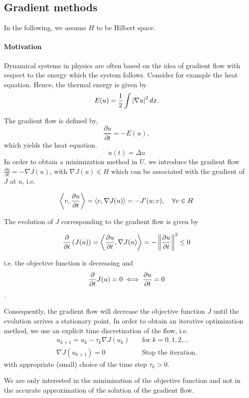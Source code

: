 \subsection{Gradient methods}
In the following, we assume $H$ to be Hilbert space.
\paragraph{Motivation}
	Dynamical systems in physics are often based on the idea of gradient flow with respect to the energy which the system follows. Consider for example the heat equation. Hence, the thermal energy is given by
	\[
		E(u)=\frac{1}{2}\int \left|\nabla u\right|^2 dx.
	\]
	
	The gradient flow is defined by,
	\[
		\frac{\partial u}{\partial t} = -E(u),
	\]
	which yields the heat equation.
	\[
		\dot{u}(t)=\Delta u
	\]
In order to obtain a minimization method in $U$, we introduce the gradient flow $\frac{\partial u}{\partial t} = -\nabla J(u)$, with $\nabla J(u)\in H$ which can be associated with the gradient of $J$ at $u$, i.e.

\[
	\left\langle  v,\frac{\partial u}{{\partial t}} \right\rangle = \left\langle v, \nabla J(u)\right\rangle = -J'(u;v), \quad \forall v \in H
\]

The evolution of $J$ corresponding to the gradient flow is given by

\[
	\frac{\partial}{\partial t} \left(J(u)\right) = \left\langle \frac{\partial u}{{\partial t}}, \nabla J(u) \right\rangle = -\left\lVert\frac{\partial u}{{\partial t}}\right\rVert^2 \leq 0
\]

i.e. the objective function is decreasing and \[\frac{\partial }{{\partial t}} J(u) =0 \iff \frac{\partial u}{{\partial t}}=0\].

Consequently, the gradient flow will decrease the objective function $J$ until the evolution arrives a stationary point. In order to obtain an iterative optimization method, we use an explicit time discretization of the flow, i.e.
\begin{align*}
u_{k+1}=u_k - \tau_k\nabla J(u_k) &\quad \text{for } k=0,1,2,.. \\
\nabla J(u_{k+1})=0 &\quad \text{Stop the iteration.}
\end{align*}
with appropriate (small) choice of the time step $\tau_k >0$. 
\begin{remark}
We are only interested in the minimization of the objective function and not in the accurate approximation of the solution of the gradient flow.
\end{remark}


